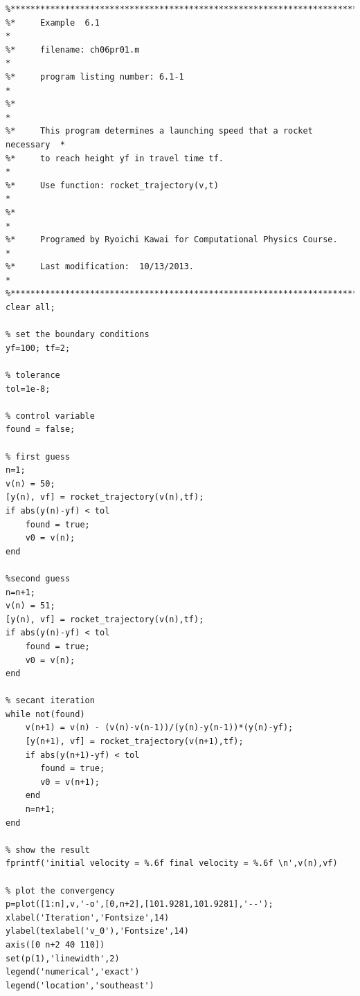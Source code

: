 \footnotesize
\begin{verbatim}
%**************************************************************************
%*     Example  6.1                                                       *
%*     filename: ch06pr01.m                                               *
%*     program listing number: 6.1-1                                      *
%*                                                                        *
%*     This program determines a launching speed that a rocket necessary  *
%*     to reach height yf in travel time tf.                              *
%*     Use function: rocket_trajectory(v,t)                               *
%*                                                                        *
%*     Programed by Ryoichi Kawai for Computational Physics Course.       *
%*     Last modification:  10/13/2013.                                    *
%**************************************************************************
clear all;

% set the boundary conditions
yf=100; tf=2;

% tolerance
tol=1e-8;

% control variable 
found = false;

% first guess
n=1;
v(n) = 50;
[y(n), vf] = rocket_trajectory(v(n),tf);
if abs(y(n)-yf) < tol
    found = true;
    v0 = v(n);
end

%second guess
n=n+1;
v(n) = 51;
[y(n), vf] = rocket_trajectory(v(n),tf);
if abs(y(n)-yf) < tol
    found = true;
    v0 = v(n);
end

% secant iteration
while not(found)
    v(n+1) = v(n) - (v(n)-v(n-1))/(y(n)-y(n-1))*(y(n)-yf);
    [y(n+1), vf] = rocket_trajectory(v(n+1),tf);
    if abs(y(n+1)-yf) < tol
       found = true;
       v0 = v(n+1);
    end
    n=n+1;
end

% show the result
fprintf('initial velocity = %.6f final velocity = %.6f \n',v(n),vf)

% plot the convergency
p=plot([1:n],v,'-o',[0,n+2],[101.9281,101.9281],'--');
xlabel('Iteration','Fontsize',14)
ylabel(texlabel('v_0'),'Fontsize',14)
axis([0 n+2 40 110])
set(p(1),'linewidth',2)
legend('numerical','exact')
legend('location','southeast')
\end{verbatim}

